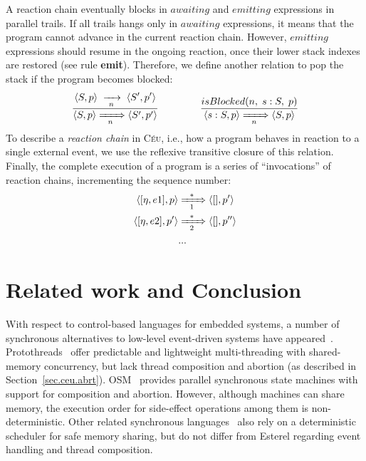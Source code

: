 \documentclass{acm_proc_article-sp}
\newcommand{\CEU}{\textsc{C\'{e}u}\xspace}
\newcommand{\code}[1] {{\small{\texttt{#1}}}}
\newcommand{\ST}{\1\xrightarrow[~n~]{}\1}
\newcommand{\LL}{\langle}
\newcommand{\RR}{\rangle}
\newcommand{\DS}{\displaystyle}
\newcommand{\rr}[1] {{\textbf{\scriptsize{#1}}}}
\newcommand{\1}{\;}
\newcommand{\2}{\;\;}
\newcommand{\3}{\;\;\;}
\newcommand{\5}{\;\;\;\;\;}
\begin{document}
A reaction chain eventually blocks in $awaiting$ and $emitting$ expressions in 
parallel trails.
%
If all trails hangs only in $awaiting$ expressions, it means that the program 
cannot advance in the current reaction chain.
%
However, $emitting$ expressions should resume in the ongoing reaction, once 
their lower stack indexes are restored (see rule \rr{emit}).
%
Therefore, we define another relation to pop the stack if the program becomes 
blocked:
%
$$
\frac
    { \DS \LL S,p \RR \ST                   \LL S',p' \RR }
    {     \LL S,p \RR \xRightarrow[~~n~~]{} \LL S',p' \RR }
%
\5\5\5
%
\frac
    { \DS isBlocked(n,\1s:S,\1p) }
    { \LL s:S,p \RR \xRightarrow[~~n~~]{} \LL S,p \RR }
$$
%
To describe a \emph{reaction chain} in \CEU, i.e., how a program behaves in 
reaction to a single external event, we use the reflexive transitive closure of 
this relation.
%
Finally, the complete execution of a program is a series of ``invocations'' of 
reaction chains, incrementing the sequence number:
%
\begin{align*}
\LL [\eta,e1], p \RR
    & \xRightarrow[~~1~~]{*}
\LL [  ], p' \RR
\\
\LL [\eta,e2], p' \RR
    & \xRightarrow[~~2~~]{*}
\LL [  ], p'' \RR
\\
& ...
\end{align*}
%

\section{Related work and Conclusion}
\label{sec.related}

With respect to control-based languages for embedded systems,
a number of synchronous alternatives to low-level event-driven systems have 
appeared~\cite{wsn.protothreads,wsn.sol,wsn.osm,pret}. 
%
Protothreads~\cite{wsn.protothreads} offer predictable and lightweight
multi-threading with shared-memory concurrency, but lack thread composition and 
abortion (as described in Section~\ref{sec.ceu.abrt}).
%
OSM~\cite{wsn.osm} provides parallel synchronous state machines with support 
for composition and abortion.
However, although machines can share memory, the execution order for 
side-effect operations among them is non-deterministic.
%
Other related synchronous languages~\cite{wsn.sol,pret} also rely on a 
deterministic scheduler for safe memory sharing, but do not differ from Esterel 
regarding event handling and thread composition.
\end{document}
